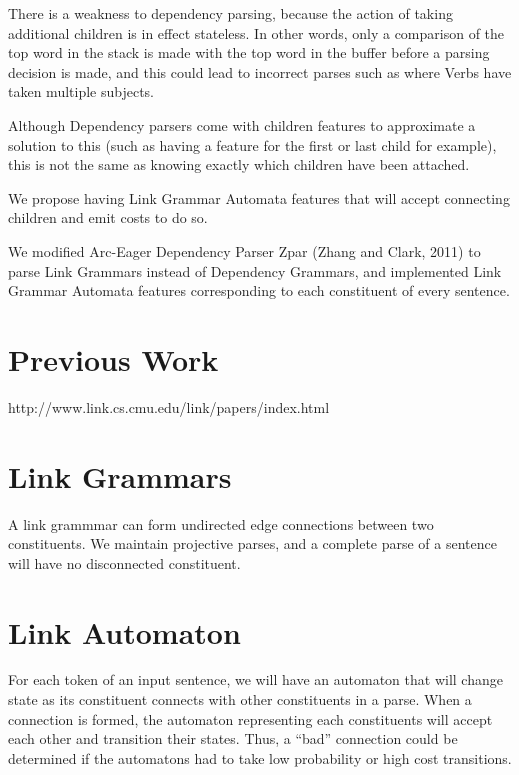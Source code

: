 \documentclass[11pt]{article}
\begin{document}
There is a weakness to dependency parsing, because the action of taking additional children is in effect stateless. In other words, only a comparison of the top word in the stack is made with the top word in the buffer before a parsing decision is made, and this could lead to incorrect parses such as where Verbs have taken multiple subjects. 

Although Dependency parsers come with children features to approximate a solution to this (such as having a feature for the first or last child for example), this is not the same as knowing exactly which children have been attached. 


We propose having Link Grammar Automata features that will accept connecting children and emit costs to do so.

We modified Arc-Eager Dependency Parser Zpar (Zhang and Clark, 2011) to parse Link Grammars instead of Dependency Grammars, and implemented Link Grammar Automata features corresponding to each constituent of every sentence.





\section{Previous Work}

http://www.link.cs.cmu.edu/link/papers/index.html


\section{Link Grammars}
A link grammmar can form undirected edge connections between two constituents. 
We maintain projective parses, and a complete parse of a sentence will have no disconnected constituent.

\section{Link Automaton}
For each token of an input sentence, we will have an automaton that will change state as its constituent connects with other constituents in a parse. When a connection is formed, the automaton representing each constituents will accept each other and transition their states. Thus, a ``bad'' connection could be determined if the automatons had to take low probability or high cost transitions.
\end{document}
